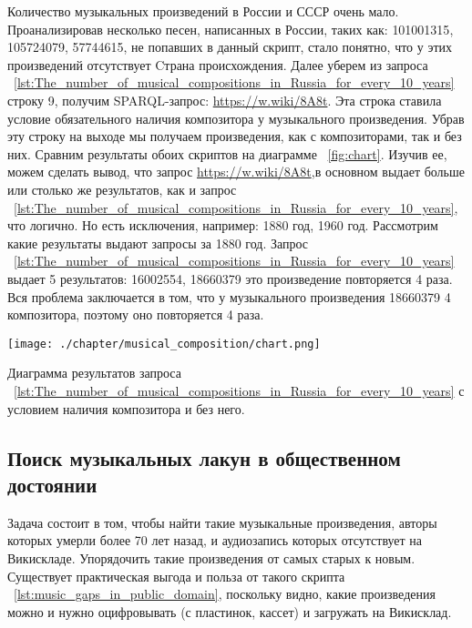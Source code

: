 Количество музыкальных произведений в России и СССР очень мало. Проанализировав несколько песен, написанных в России, таких как:  {101001315},   {105724079},  {57744615}, не попавших в данный скрипт, стало понятно, что у этих произведений отсутствует  {Cтрана происхождения}.
Далее уберем из запроса ~\ref{lst:The_number_of_musical_compositions_in_Russia_for_every_10_years} строку 9, получим SPARQL-запрос: \href{https://w.wiki/8A8t}{https://w.wiki/8A8t}. Эта строка ставила условие обязательного наличия композитора у музыкального произведения. Убрав эту строку на выходе мы получаем произведения, как с композиторами, так и без них. Сравним результаты обоих скриптов на диаграмме ~\ref{fig:chart}. Изучив ее, можем сделать вывод, что запрос \href{https://w.wiki/8A8t}{https://w.wiki/8A8t},в основном выдает больше или столько же результатов, как и запрос ~\ref{lst:The_number_of_musical_compositions_in_Russia_for_every_10_years}, что логично. Но есть исключения, например: 1880 год, 1960 год. Рассмотрим какие результаты выдают запросы за 1880 год. Запрос ~\ref{lst:The_number_of_musical_compositions_in_Russia_for_every_10_years} выдает 5 результатов:  {16002554},  {18660379} это произведение повторяется 4 раза. Вся проблема заключается в том, что у музыкального произведения   {18660379} 4 композитора, поэтому оно повторяется 4 раза.

\begin{marginfigure}[0\baselineskip]
	\texttt{[image: ./chapter/musical\_composition/chart.png]}
	\caption[Диаграмма результатов запроса ~\ref{lst:The_number_of_musical_compositions_in_Russia_for_every_10_years} с условием наличия композитора и без него.]{Диаграмма результатов запроса ~\ref{lst:The_number_of_musical_compositions_in_Russia_for_every_10_years} с условием наличия композитора и без него.}%
	\label{fig:chart}%
\end{marginfigure}

\subsection{Поиск музыкальных лакун в общественном достоянии}
Задача состоит в том, чтобы найти такие музыкальные произведения, авторы которых умерли более 70 лет назад, и аудиозапись которых отсутствует на Викискладе. Упорядочить такие произведения от самых старых к новым. Существует практическая выгода и польза от такого скрипта ~\ref{lst:music_gaps_in_public_domain}, поскольку видно, какие произведения можно и нужно оцифровывать (с пластинок, кассет) и загружать на Викисклад.

